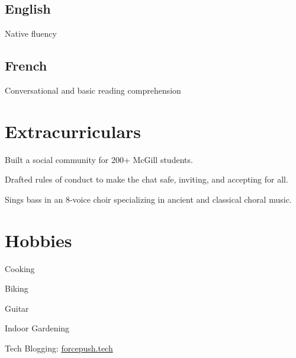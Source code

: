 \documentclass[]{jidicula-resume}
\begin{document}
\subsection{English}
Native fluency
\sectionsep
\subsection{French}
Conversational and basic reading comprehension
\sectionsep

\section{Extracurriculars}
 
\vspace{\topsep}
\begin{tightemize}
\item Built a social community for 200+ McGill students.
\item Drafted rules of conduct to make the chat safe, inviting, and accepting for all.
\end{tightemize}
\sectionsep
{} 
\vspace{\topsep}
\begin{tightemize}
\item Sings bass in an 8-voice choir specializing in ancient and classical choral music.
\end{tightemize}
\sectionsep

\section{Hobbies}
\sectionsep
\begin{tightemize}
\item Cooking
\item Biking
\item Guitar
\item Indoor Gardening
\item Tech Blogging: \href{http://bit.ly/jidicula-site}{forcepush.tech}
\end{tightemize}
\sectionsep

\end{document}
